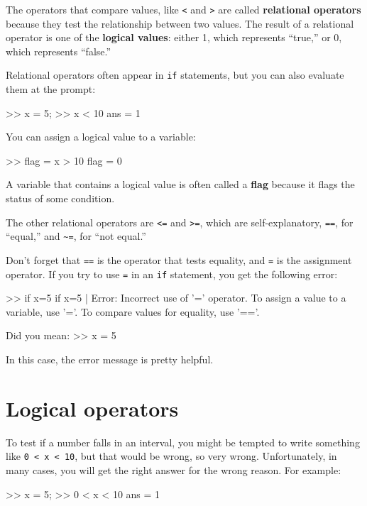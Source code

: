 \documentclass[
]{book}
\numberwithin{Answer}{chapter}
\numberwithin{Exercise}{chapter}
\begin{document}
The operators that compare values, like {\tt <} and {\tt >} are
called {\bf relational operators} because they test the relationship
between two values.  The result of a relational operator is one
of the {\bf logical values}:
either 1, which represents ``true,''  or 0, which represents ``false.''

Relational operators often appear in {\tt if} statements, but you can also evaluate them at the prompt:

\begin{code}
>> x = 5;
>> x < 10
ans = 1
\end{code}

You can assign a logical value to a variable:

\begin{code}
>> flag = x > 10
flag = 0
\end{code}

A variable that contains a logical value is often called a {\bf flag}
because it flags the status of some condition.

The other relational operators are {\tt <=} and {\tt >=}, which are
self-explanatory, {\tt ==}, for ``equal,'' and
\verb+~=+, for ``not equal.''

Don't forget that {\tt ==} is the operator that tests equality,
and {\tt =} is the assignment operator.  If you try to use {\tt =} in
an {\tt if} statement, you get the following error:

\begin{code}
>> if x=5
 if x=5
     |
Error: Incorrect use of '=' operator. 
To assign a value to a variable, use '='.
To compare values for equality, use '=='.
 
Did you mean:
>> x = 5
\end{code}

In this case, the error message is pretty helpful.


\section{Logical operators}
\label{sect:logop}

To test if a number falls in an interval, you might be
tempted to write something like {\tt 0 < x < 10}, but that
would be wrong, so very wrong.  Unfortunately, in many cases,
you will get the right answer for the wrong reason.  For
example:

\begin{code}
>> x = 5;
>> 0 < x < 10            %
ans = 1
\end{code}
\end{document}
